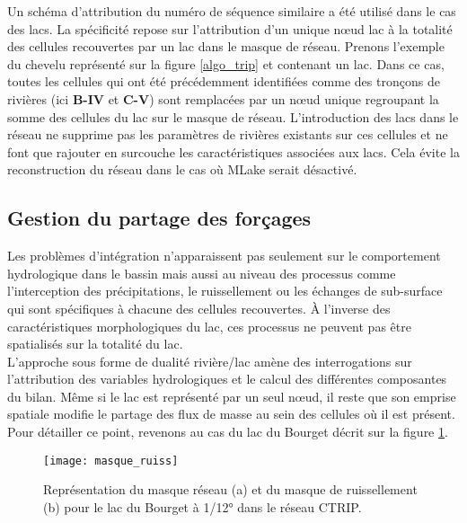 \noindent Un schéma d'attribution du numéro de séquence similaire a été utilisé dans le cas des lacs. La spécificité repose sur l'attribution d'un unique nœud lac à la totalité des cellules recouvertes par un lac dans le masque de réseau.
Prenons l'exemple du chevelu représenté sur la figure \ref{algo_trip} et contenant un lac. Dans ce cas, toutes les cellules qui ont été précédemment identifiées comme des tronçons de rivières (ici \textbf{B-IV} et \textbf{C-V}) sont remplacées par un nœud unique regroupant la somme des cellules du lac sur le masque de réseau. L'introduction des lacs dans le réseau ne supprime pas les paramètres de rivières existants sur ces cellules et ne font que rajouter en surcouche les caractéristiques associées aux lacs. Cela évite la reconstruction du réseau dans le cas où MLake serait désactivé. \\

\subsection{{\selectfont Gestion du partage des forçages }}
\label{sec:part_forcage}

Les problèmes d'intégration n'apparaissent pas seulement sur le comportement hydrologique dans le bassin mais aussi au niveau des processus comme l'interception des précipitations, le ruissellement ou les échanges de sub-surface qui sont spécifiques à chacune des cellules recouvertes. À l'inverse des caractéristiques morphologiques du lac, ces processus ne peuvent pas être spatialisés sur la totalité du lac.\\

L'approche sous forme de dualité rivière/lac amène des interrogations sur l'attribution des variables hydrologiques et le calcul des différentes composantes du bilan. Même si le lac est représenté par un seul nœud, il reste que son emprise spatiale modifie le partage des flux de masse au sein des cellules où il est présent. Pour détailler ce point, revenons au cas du lac du Bourget décrit sur la figure \ref{bourget}. 

\begin{figure}[h!]
\centering
  \texttt{[image: masque\_ruiss]}  
  \caption{Représentation du masque réseau (a) et du masque de ruissellement (b) pour le lac du Bourget à 1/12° dans le réseau CTRIP.}
  \label{bourget}
\end{figure} 

